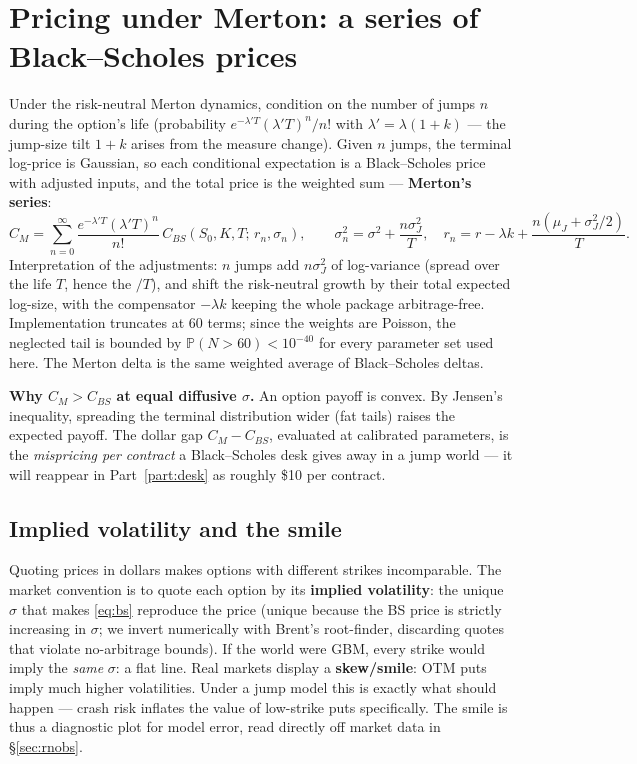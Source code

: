 \documentclass[11pt,a4paper]{article}
\newcommand{\Prob}{\mathbb{P}}
\begin{document}
\section{Pricing under Merton: a series of Black--Scholes prices}
\label{sec:mertonpricing}

Under the risk-neutral Merton dynamics, condition on the number of jumps $n$
during the option's life (probability
$e^{-\lambda' T}(\lambda' T)^n/n!$ with $\lambda'=\lambda(1+k)$ --- the
jump-size tilt $1+k$ arises from the measure change). Given $n$ jumps, the
terminal log-price is Gaussian, so each conditional expectation is a
Black--Scholes price with adjusted inputs, and the total price is the weighted
sum --- \textbf{Merton's series}:
\begin{equation}
C_M=\sum_{n=0}^{\infty}\frac{e^{-\lambda' T}(\lambda' T)^n}{n!}\,
C_{BS}(S_0,K,T;\,r_n,\sigma_n),\qquad
\sigma_n^2=\sigma^2+\frac{n\sigma_J^2}{T},\quad
r_n=r-\lambda k+\frac{n(\mu_J+\sigma_J^2/2)}{T}.
\label{eq:mertonseries}
\end{equation}
Interpretation of the adjustments: $n$ jumps add $n\sigma_J^2$ of log-variance
(spread over the life $T$, hence the $/T$), and shift the risk-neutral growth by
their total expected log-size, with the compensator $-\lambda k$ keeping the
whole package arbitrage-free. Implementation truncates at 60 terms; since the
weights are Poisson, the neglected tail is bounded by
$\Prob(N>60)<10^{-40}$ for every parameter set used here. The Merton delta is
the same weighted average of Black--Scholes deltas.

\begin{keybox}
\textbf{Why $C_M>C_{BS}$ at equal diffusive $\sigma$.} An option payoff is
convex. By Jensen's inequality, spreading the terminal distribution wider (fat
tails) raises the expected payoff. The dollar gap
$C_M-C_{BS}$, evaluated at calibrated parameters, is the \emph{mispricing per
contract} a Black--Scholes desk gives away in a jump world --- it will reappear
in Part~\ref{part:desk} as roughly \$10 per contract.
\end{keybox}

\subsection{Implied volatility and the smile}
\label{sec:iv}
Quoting prices in dollars makes options with different strikes incomparable.
The market convention is to quote each option by its \textbf{implied
volatility}: the unique $\sigma$ that makes \eqref{eq:bs} reproduce the price
(unique because the BS price is strictly increasing in $\sigma$; we invert
numerically with Brent's root-finder, discarding quotes that violate
no-arbitrage bounds). If the world were GBM, every strike would imply the
\emph{same} $\sigma$: a flat line. Real markets display a \textbf{skew/smile}:
OTM puts imply much higher volatilities. Under a jump model this is exactly
what should happen --- crash risk inflates the value of low-strike puts
specifically. The smile is thus a diagnostic plot for model error, read
directly off market data in \S\ref{sec:rnobs}.
\end{document}
